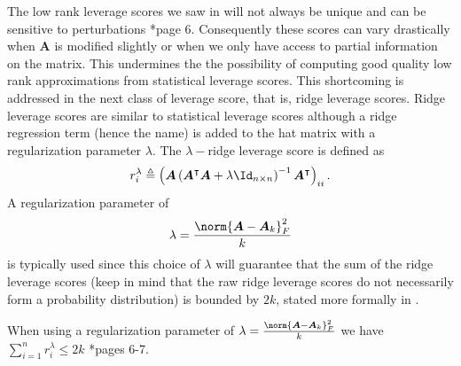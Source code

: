 The low rank leverage scores we saw in  will not always be unique and can be sensitive to perturbations \cite{DBLP:journals/corr/CohenMM15}*{page 6}. Consequently these scores can vary drastically when $\bm{A}$ is modified slightly or when we only have access to partial information on the matrix. This undermines the the possibility of computing good quality low rank approximations from statistical leverage scores. This shortcoming is addressed in the next class of leverage score, that is, ridge leverage scores. Ridge leverage scores are similar to statistical leverage scores although a ridge regression term (hence the name) is added to the hat matrix with a regularization parameter $\lambda$. The $\lambda-$ridge leverage score is defined as
\begin{equation*}
    r_{i}^{\lambda} \triangleq \left( \bm{A} \left( \bm{A}^{\intercal} \bm{A} + \lambda \Id_{n \times n} \right)^{-1} \bm{A}^{\intercal} \right)_{ii}.
\end{equation*}
A regularization parameter of
\begin{equation*} \label{eq: rid-lev-reg-param}
    \lambda = \frac{\norm{\bm{A} - \bm{A}_k}_F^{2}}{k}
\end{equation*}
is typically used since this choice of $\lambda$ will guarantee that the sum of the ridge leverage scores (keep in mind that the raw ridge leverage scores do not necessarily form a probability distribution) is bounded by $2k$, stated more formally in .
\begin{lem} \label{lem: rid-lev-reg-param-bound}
    When using a regularization parameter of $\lambda = \frac{\norm{\bm{A} - \bm{A}_k}_F^{2}}{k}$ we have $\sum_{i=1}^{n} r_{i}^{\lambda} \leq 2k$ \cite{DBLP:journals/corr/CohenMM15}*{pages 6-7}.
\end{lem}
